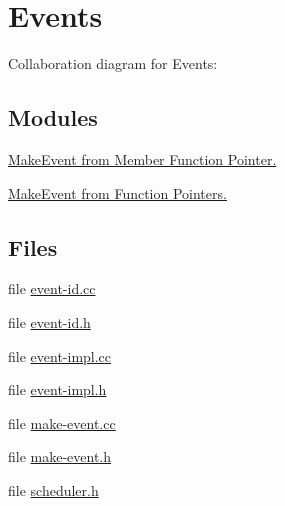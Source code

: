\hypertarget{group__events}{}\section{Events}
\label{group__events}
Collaboration diagram for Events\+:
\subsection*{Modules}
\begin{DoxyCompactItemize}
\item 
\hyperlink{group__makeeventmemptr}{Make\+Event from Member Function Pointer.}
\item 
\hyperlink{group__makeeventfnptr}{Make\+Event from Function Pointers.}
\end{DoxyCompactItemize}
\subsection*{Files}
\begin{DoxyCompactItemize}
\item 
file \hyperlink{event-id_8cc}{event-\/id.\+cc}
\item 
file \hyperlink{event-id_8h}{event-\/id.\+h}
\item 
file \hyperlink{event-impl_8cc}{event-\/impl.\+cc}
\item 
file \hyperlink{event-impl_8h}{event-\/impl.\+h}
\item 
file \hyperlink{make-event_8cc}{make-\/event.\+cc}
\item 
file \hyperlink{make-event_8h}{make-\/event.\+h}
\item 
file \hyperlink{scheduler_8h}{scheduler.\+h}
\end{DoxyCompactItemize}
